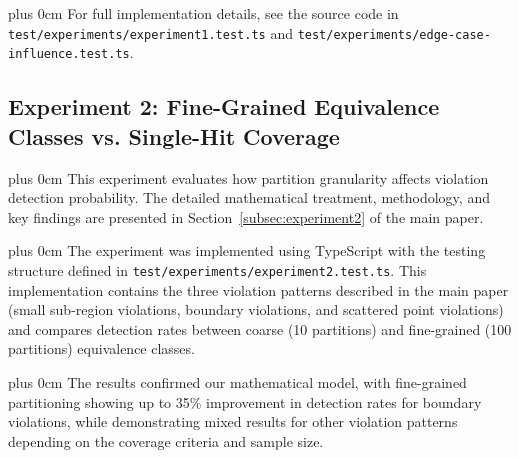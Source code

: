 \documentclass[conference]{IEEEtran}
\newcommand{\justifytext}{\leftskip=0pt \rightskip=0pt plus 0cm}
\begin{document}
\justifytext
For full implementation details, see the source code in \texttt{test/experiments/experiment1.test.ts} and \texttt{test/experiments/edge-case-influence.test.ts}.

\subsection{Experiment 2: Fine-Grained Equivalence Classes vs. Single-Hit Coverage}

\justifytext
This experiment evaluates how partition granularity affects violation detection probability. The detailed mathematical treatment, methodology, and key findings are presented in Section~\ref{subsec:experiment2} of the main paper. 

\justifytext
The experiment was implemented using TypeScript with the testing structure defined in \texttt{test/experiments/experiment2.test.ts}. This implementation contains the three violation patterns described in the main paper (small sub-region violations, boundary violations, and scattered point violations) and compares detection rates between coarse (10 partitions) and fine-grained (100 partitions) equivalence classes.

\justifytext
The results confirmed our mathematical model, with fine-grained partitioning showing up to 35\% improvement in detection rates for boundary violations, while demonstrating mixed results for other violation patterns depending on the coverage criteria and sample size.



\end{document}
